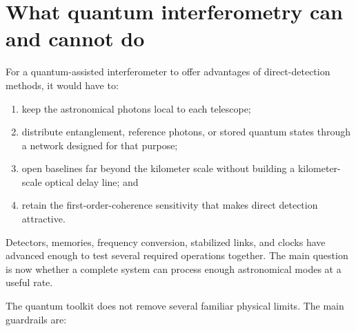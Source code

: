\documentclass[]{spie}
\begin{document}
\FloatBarrier
\section{What quantum interferometry can and cannot do}
\label{sec:guardrails}

For a quantum-assisted interferometer to offer advantages of direct-detection methods, it would have to:
\begin{enumerate}[leftmargin=*,itemsep=2pt]
    \item keep the astronomical photons local to each telescope;
    \item distribute entanglement, reference photons, or stored quantum states through a network designed for that purpose;
    \item open baselines far beyond the kilometer scale without building a kilometer-scale optical delay line; and
    \item retain the first-order-coherence sensitivity that makes direct detection attractive.
\end{enumerate}
Detectors, memories, frequency conversion, stabilized links, and clocks have advanced enough to test several required operations together. The main question is now whether a complete system can process enough astronomical modes at a useful rate.

The quantum toolkit does not remove several familiar physical limits. The main guardrails are:
\end{document}
